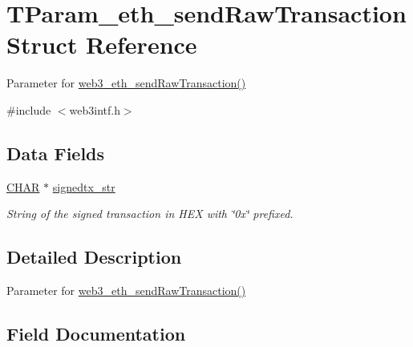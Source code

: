 \hypertarget{struct_t_param__eth__send_raw_transaction}{}\section{T\+Param\+\_\+eth\+\_\+send\+Raw\+Transaction Struct Reference}
\label{struct_t_param__eth__send_raw_transaction}


Parameter for \mbox{\hyperlink{web3intf_8c_ae65319be9cc0257c333a14ed4ab504cf}{web3\+\_\+eth\+\_\+send\+Raw\+Transaction()}}  




{\ttfamily \#include $<$web3intf.\+h$>$}

\subsection*{Data Fields}
\begin{DoxyCompactItemize}
\item 
\mbox{\hyperlink{boattypes_8h_aebb9e13210d88d43e32e735ada43a425}{C\+H\+AR}} $\ast$ \mbox{\hyperlink{struct_t_param__eth__send_raw_transaction_ac9ef7181a7592a215e1be02dd9d70694}{signedtx\+\_\+str}}
\begin{DoxyCompactList}\small\item\em String of the signed transaction in H\+EX with \char`\"{}0x\char`\"{} prefixed. \end{DoxyCompactList}\end{DoxyCompactItemize}


\subsection{Detailed Description}
Parameter for \mbox{\hyperlink{web3intf_8c_ae65319be9cc0257c333a14ed4ab504cf}{web3\+\_\+eth\+\_\+send\+Raw\+Transaction()}} 

\subsection{Field Documentation}
\mbox{\label{struct_t_param__eth__send_raw_transaction_ac9ef7181a7592a215e1be02dd9d70694}} 

